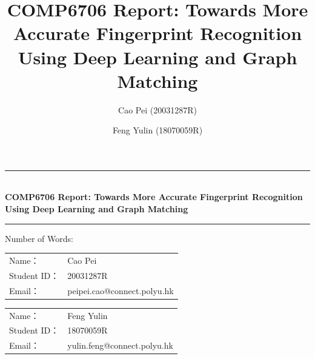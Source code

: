 \documentclass[12pt, a4paper]{article}
\title{COMP6706 Report: Towards More Accurate Fingerprint Recognition Using Deep Learning and Graph Matching}
\author{
    Cao Pei (20031287R) \\
    \text{peipei.cao@connect.polyu.hk}
    \and 
    Feng Yulin (18070059R) \\
    \text{yulin.feng@connect.polyu.hk}
}
\date{}
\newcommand{\horrule}[1]{\rule{\linewidth}{#1}}
\newcommand{\entit}{COMP6706 Report: Towards More Accurate Fingerprint Recognition Using Deep Learning and Graph Matching}
\newcommand{\numword}{Number of Words: }
\begin{document}
\begin{titlepage}
    \begin{center}
        \horrule{0.5pt} \\ [0.4cm]
        \vspace{-1.5ex}
        { \bfseries \entit \\ \vspace{0.4cm}}
          \horrule{2pt} \vspace{-2ex}
        \numword \\
    \end{center}

    \vspace{3cm}
    \begin{table}[h]
        \centering
        \begin{tabular}{p{3cm}<{\raggedleft} p{6cm}<{\centering}}
          Name： & {Cao Pei}            \\
          Student ID： & {20031287R}          \\
          Email： & {peipei.cao@connect.polyu.hk} \\
        \end{tabular}
    \end{table}

    \vspace{3cm}
    \begin{table}[h]
        \centering
        \begin{tabular}{p{3cm}<{\raggedleft} p{6cm}<{\centering}}
          Name： & {Feng Yulin}            \\
          Student ID： & {18070059R}          \\
          Email： & {yulin.feng@connect.polyu.hk} \\
        \end{tabular}
    \end{table}

\end{titlepage}

\newpage
\end{document}
